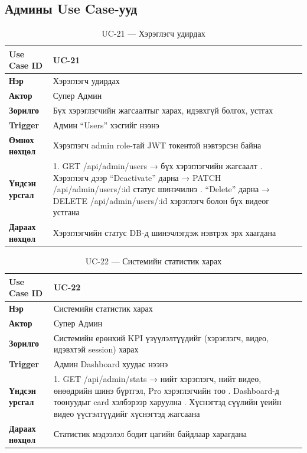 \subsection{Админы Use Case-ууд}

\begin{table}[H]
\centering
\label{tab:uc21}
\begin{tabular}{|l|p{9.5cm}|}
\hline
\textbf{Use Case ID} & UC-21 \\
\hline
\textbf{Нэр} & Хэрэглэгч удирдах \\
\hline
\textbf{Актор} & Супер Админ \\
\hline
\textbf{Зорилго} & Бүх хэрэглэгчийн жагсаалтыг харах, идэвхгүй болгох, устгах \\
\hline
\textbf{Trigger} & Админ ``Users'' хэсгийг нээнэ \\
\hline
\textbf{Өмнөх нөхцөл} & Хэрэглэгч admin role-тай JWT токентой нэвтэрсэн байна \\
\hline
\textbf{Үндсэн урсгал} &
1. GET /api/admin/users → бүх хэрэглэгчийн жагсаалт \newline
2. Хэрэглэгч дээр ``Deactivate'' дарна → PATCH /api/admin/users/:id статус шинэчилнэ \newline
3. ``Delete'' дарна → DELETE /api/admin/users/:id хэрэглэгч болон бүх видеог устгана \\
\hline
\textbf{Дараах нөхцөл} & Хэрэглэгчийн статус DB-д шинэчлэгдэж нэвтрэх эрх хаагдана \\
\hline
\end{tabular}
\caption{UC-21 --- Хэрэглэгч удирдах}
\end{table}

\begin{table}[H]
\centering
\label{tab:uc22}
\begin{tabular}{|l|p{9.5cm}|}
\hline
\textbf{Use Case ID} & UC-22 \\
\hline
\textbf{Нэр} & Системийн статистик харах \\
\hline
\textbf{Актор} & Супер Админ \\
\hline
\textbf{Зорилго} & Системийн ерөнхий KPI үзүүлэлтүүдийг (хэрэглэгч, видео, идэвхтэй session) харах \\
\hline
\textbf{Trigger} & Админ Dashboard хуудас нээнэ \\
\hline
\textbf{Үндсэн урсгал} &
1. GET /api/admin/stats → нийт хэрэглэгч, нийт видео, өнөөдрийн шинэ бүртгэл, Pro хэрэглэгчийн тоо \newline
2. Dashboard-д тоонуудыг card хэлбэрээр харуулна \newline
3. Хүснэгтэд сүүлийн үеийн видео үүсгэлтүүдийг хүснэгтэд жагсаана \\
\hline
\textbf{Дараах нөхцөл} & Статистик мэдээлэл бодит цагийн байдлаар харагдана \\
\hline
\end{tabular}
\caption{UC-22 --- Системийн статистик харах}
\end{table}

